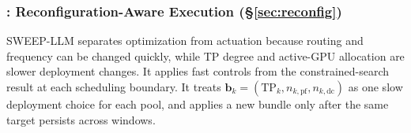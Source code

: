 \subsubsection*{\textnormal{\textbf{: Reconfiguration-Aware Execution (\S\ref{sec:reconfig})}}}
%
SWEEP-LLM separates optimization from actuation because routing and frequency can be changed quickly, while TP degree and active-GPU allocation are slower deployment changes.
It applies fast controls from the constrained-search result at each scheduling boundary.
It treats $\mathbf{b}_k=(\mathrm{TP}_k,n_{k,\mathrm{pf}},n_{k,\mathrm{dc}})$ as one slow deployment choice for each pool, and applies a new bundle only after the same target persists across windows.

